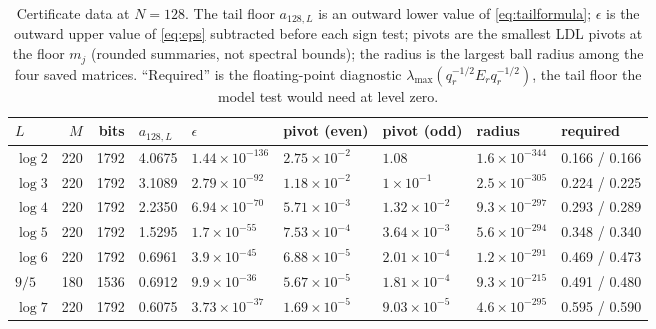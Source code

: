 \begin{table}[ht]
\centering
\caption{Certificate data at $N=128$. The tail floor $a_{128,L}$ is an outward lower value of \eqref{eq:tailformula}; $\epsilon$ is the outward upper value of \eqref{eq:eps} subtracted before each sign test; pivots are the smallest LDL pivots at the floor $m_j$ (rounded summaries, not spectral bounds); the radius is the largest ball radius among the four saved matrices. ``Required'' is the floating-point diagnostic $\lambda_{\max}(q_r^{-1/2}E_rq_r^{-1/2})$, the tail floor the model test would need at level zero.}
\label{tab:certificate}
\footnotesize\setlength{\tabcolsep}{3.5pt}
\begin{tabular}{@{}lrrllllll@{}}
\toprule
$L$ & $M$ & bits & $a_{128,L}$ & $\epsilon$ & pivot (even) & pivot (odd) & radius & required\\
\midrule
$\log2$ & 220 & 1792 & 4.0675 & $1.44\times10^{-136}$ & $2.75\times10^{-2}$ & $1.08$ & $1.6\times10^{-344}$ & 0.166 / 0.166\\
$\log3$ & 220 & 1792 & 3.1089 & $2.79\times10^{-92}$ & $1.18\times10^{-2}$ & $1\times10^{-1}$ & $2.5\times10^{-305}$ & 0.224 / 0.225\\
$\log4$ & 220 & 1792 & 2.2350 & $6.94\times10^{-70}$ & $5.71\times10^{-3}$ & $1.32\times10^{-2}$ & $9.3\times10^{-297}$ & 0.293 / 0.289\\
$\log5$ & 220 & 1792 & 1.5295 & $1.7\times10^{-55}$ & $7.53\times10^{-4}$ & $3.64\times10^{-3}$ & $5.6\times10^{-294}$ & 0.348 / 0.340\\
$\log6$ & 220 & 1792 & 0.6961 & $3.9\times10^{-45}$ & $6.88\times10^{-5}$ & $2.01\times10^{-4}$ & $1.2\times10^{-291}$ & 0.469 / 0.473\\
$9/5$ & 180 & 1536 & 0.6912 & $9.9\times10^{-36}$ & $5.67\times10^{-5}$ & $1.81\times10^{-4}$ & $9.3\times10^{-215}$ & 0.491 / 0.480\\
$\log7$ & 220 & 1792 & 0.6075 & $3.73\times10^{-37}$ & $1.69\times10^{-5}$ & $9.03\times10^{-5}$ & $4.6\times10^{-295}$ & 0.595 / 0.590\\
\bottomrule
\end{tabular}
\end{table}
